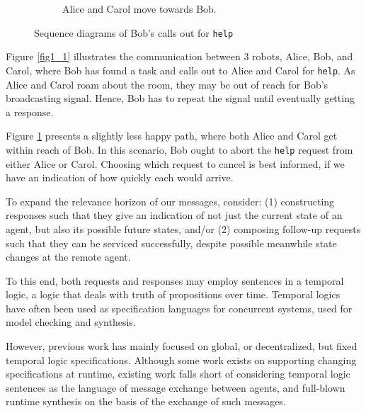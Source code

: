 \documentclass[conference]{IEEEtran}
\begin{document}
\begin{figure}
\begin{subfigure}{0.4\textwidth}
\caption{Alice and Carol move towards Bob.}
\label{fig1_2}
\end{subfigure}
\caption{Sequence diagrams of Bob's calls out for
\label{fig1}
\texttt{help}}
\end{figure}

Figure \ref{fig1_1} illustrates the communication between 3 robots,
Alice, Bob, and Carol, where Bob has found a task and calls out to
Alice and Carol for \texttt{help}. As Alice and Carol roam about the
room, they may be out of reach for Bob's broadcasting signal. Hence,
Bob has to repeat the signal until eventually getting a response.

Figure \ref{fig1_2} presents a slightly less happy path, where both
Alice and Carol get within reach of Bob. In this scenario, Bob ought
to abort the \texttt{help} request from either Alice or Carol.
Choosing which request to cancel is best informed, if we have an
indication of how quickly each would arrive.

To expand the relevance horizon of our messages, consider: (1)
constructing responses such that they give an indication of not just
the current state of an agent, but also its possible future states,
and/or (2) composing follow-up requests such that they can be serviced
successfully, despite possible meanwhile state changes at the remote
agent.

To this end, both requests and responses may employ sentences in a
temporal logic, a logic that deals with truth of propositions over
time\cite{1977-Temporal-Logic}. Temporal logics have often been used
as specification languages for concurrent systems, used for model
checking and
synthesis\cite{2021-Specification-Patterns-for-Robotic-Missions}.

However, previous work has mainly focused on global, or decentralized,
but fixed temporal logic specifications. Although some work exists on
supporting changing specifications at
runtime\cite{2022-Live-Synthesis}, existing work falls short of
considering temporal logic sentences as the language of message
exchange between agents, and full-blown runtime synthesis on the basis
of the exchange of such messages.
\end{document}
